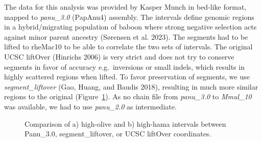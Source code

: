 \documentclass[
  11pt,
  a4paper,
]{scrbook}
\let\oldemph\emph
\renewcommand\emph[1]{\oldemph{\color{gray}#1}}
\begin{document}
The data for this analysis was provided by Kasper Munch in bed-like
format, mapped to \emph{panu\_3.0} (PapAnu4) assembly. The intervals
define genomic regions in a hybrid/migrating population of baboon where
strong negative selection acts against minor parent ancestry (Sørensen
et al. 2023). The segments had to be lifted to rheMac10 to be able to
correlate the two sets of intervals. The original UCSC liftOver
(Hinrichs 2006) is very strict and does not try to conserve segments in
favor of accuracy e.g.~inversions or small indels, which results in
highly scattered regions when lifted. To favor preservation of segments,
we use \emph{segment\_liftover} (Gao, Huang, and Baudis 2018), resulting
in much more similar regions to the original
(Figure~\ref{fig-compare-liftover}). As no chain file from
\emph{panu\_3.0} to \emph{Mmul\_10} was available, we had to use
\emph{panu\_2.0} as intermediate.

\begin{figure}[H]


\caption{\label{fig-compare-liftover}Comparison of a) high-olive and b)
high-hama intervals between Panu\_3.0, segment\_liftover, or UCSC
liftOver coordinates.}

\end{figure}%
\end{document}
